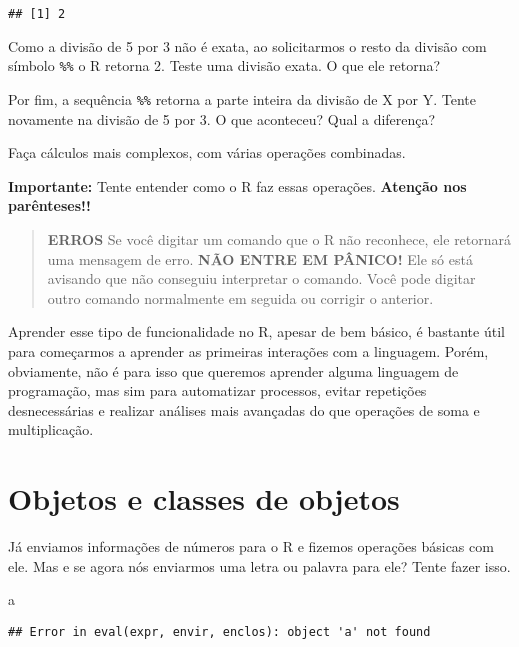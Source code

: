 \documentclass[]{book}
\newenvironment{Shaded}{\begin{snugshade}}{\end{snugshade}}
\newcommand{\NormalTok}[1]{#1}
\theoremstyle{definition}
\theoremstyle{definition}
\theoremstyle{definition}
\theoremstyle{remark}
\let\BeginKnitrBlock\begin \let\EndKnitrBlock\end
\begin{document}
\begin{verbatim}
## [1] 2
\end{verbatim}

Como a divisão de 5 por 3 não é exata, ao solicitarmos o resto da divisão com símbolo \texttt{\%\%} o R retorna 2. Teste uma divisão exata. O que ele retorna?

Por fim, a sequência \texttt{\%\%} retorna a parte inteira da divisão de X por Y. Tente novamente na divisão de 5 por 3. O que aconteceu? Qual a diferença?

\BeginKnitrBlock{exercise}
\protect\hypertarget{exr:unnamed-chunk-4}{}{\label{exr:unnamed-chunk-4} }Faça cálculos mais complexos, com várias operações combinadas.
\EndKnitrBlock{exercise}

\textbf{Importante:} Tente entender como o R faz essas operações. \textbf{Atenção nos parênteses!!}

\begin{quote}
\textbf{{ERROS}} Se você digitar um comando que o R não reconhece, ele retornará uma mensagem de erro.
\textbf{{NÃO ENTRE EM PÂNICO!}} Ele só está avisando que não conseguiu interpretar o comando. Você pode digitar outro comando normalmente em seguida ou corrigir o anterior.
\end{quote}

Aprender esse tipo de funcionalidade no R, apesar de bem básico, é bastante útil para começarmos a aprender as primeiras interações com a linguagem. Porém, obviamente, não é para isso que queremos aprender alguma linguagem de programação, mas sim para automatizar processos, evitar repetições desnecessárias e realizar análises mais avançadas do que operações de soma e multiplicação.

\hypertarget{objetos-e-classes-de-objetos}{%
\section{Objetos e classes de objetos}\label{objetos-e-classes-de-objetos}}

Já enviamos informações de números para o R e fizemos operações básicas com ele. Mas e se agora nós enviarmos uma letra ou palavra para ele? Tente fazer isso.

\begin{Shaded}
\begin{Highlighting}[]
\NormalTok{a}
\end{Highlighting}
\end{Shaded}

\begin{verbatim}
## Error in eval(expr, envir, enclos): object 'a' not found
\end{verbatim}
\end{document}
